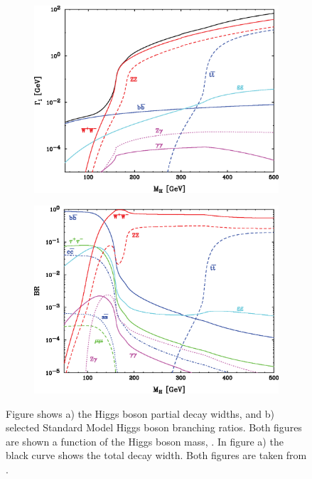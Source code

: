 \begin{figure}[tbph]
\centering
    \begin{subfigure}[b]{0.45\textwidth}
        \includegraphics[width=\textwidth]{theory/HiggsDecayWidth}
        \caption{}
        \label{fig:theoryHiggsDecayWidth}
    \end{subfigure}
    \begin{subfigure}[b]{0.45\textwidth}
        \includegraphics[width=\textwidth]{theory/HiggsBranchingRatio}
        \caption{}
        \label{fig:theoryHiggsBranchingRatio}
    \end{subfigure}
\caption[SM Higgs boson decay width and branching ratios]%
{Figure shows a) the Higgs boson partial decay widths, and b) selected Standard Model Higgs boson branching ratios. Both figures are shown a function of the Higgs boson mass, \Hmass. In figure a) the black curve shows the total decay width. Both figures are taken from \cite{Rainwater:2007cp}.}
\label{fig:theoryHiggsPhenomenology}
\end{figure}


